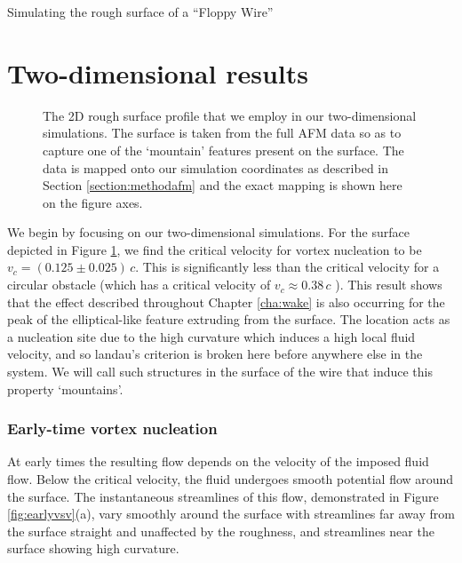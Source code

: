 \begin{chapter}{\label{cha:afm}Simulating the rough surface of a ``Floppy Wire''}
\section{Two-dimensional results}
\begin{figure}
  \centering
  \caption{\label{fig:surfprofile} The 2D rough surface profile that we employ in our two-dimensional simulations. The surface is taken from the full AFM data so as to capture one of the `mountain' features present on the surface. The data is mapped onto our simulation coordinates as described in Section \ref{section:methodafm} and the exact mapping is shown here on the figure axes.}
\end{figure}

We begin by focusing on our two-dimensional simulations. For the surface depicted in Figure \ref{fig:surfprofile}, we find the critical velocity for vortex nucleation to be $v_c=(0.125\pm0.025)\,c$. This is significantly less than the critical velocity for a circular obstacle (which has a critical velocity of $v_c\approx 0.38\,c$ \cite{frisch92,nore93,win00,huepe00}). This result shows that the effect described throughout Chapter \ref{cha:wake} is also occurring for the peak of the elliptical-like feature extruding from the surface. The location acts as a nucleation site due to the high curvature which induces a high local fluid velocity, and so landau's criterion is broken here before anywhere else in the system. We will call such structures in the surface of the wire that induce this property `mountains'.

\subsubsection{Early-time vortex nucleation}
At early times the resulting flow depends on the velocity of the imposed fluid flow. Below the critical velocity, the fluid undergoes smooth potential flow around the surface. The instantaneous streamlines of this flow, demonstrated in Figure \ref{fig:earlyvsv}(a), vary smoothly around the surface with streamlines far away from the surface straight and unaffected by the roughness, and streamlines near the surface showing high curvature.


\end{chapter}

